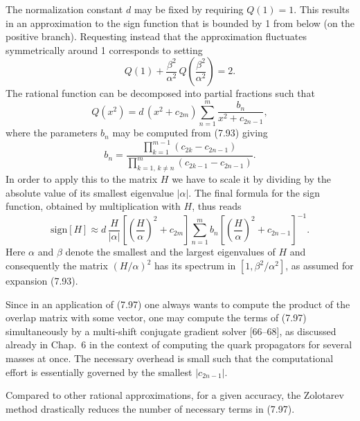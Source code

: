 The normalization constant $d$ may be fixed by requiring $Q(1) = 1$. This
results in an approximation to the sign function that is bounded by 1 from
below (on the positive branch). Requesting instead that the approximation
fluctuates symmetrically around 1 corresponds to setting
\begin{equation}
  Q(1) + \frac{\beta^2}{\alpha^2}\,Q\!\left(\frac{\beta^2}{\alpha^2}\right) = 2 .
\end{equation}
The rational function can be decomposed into partial fractions such that
\begin{equation}
  Q(x^2) = d\,(x^2 + c_{2m})\sum_{n=1}^{m}\frac{b_n}{x^2 + c_{2n-1}},
\end{equation}
where the parameters $b_n$ may be computed from (7.93) giving
\begin{equation}
  b_n = \frac{\prod_{k=1}^{m-1}(c_{2k} - c_{2n-1})}
             {\prod_{k=1,\,k\neq n}^{m}(c_{2k-1} - c_{2n-1})} .
\end{equation}
In order to apply this to the matrix $H$ we have to scale it by dividing by
the absolute value of its smallest eigenvalue $|\alpha|$. The final formula for
the sign function, obtained by multiplication with $H$, thus reads
\begin{equation}
  \mathrm{sign}[H] \approx d\,\frac{H}{|\alpha|}\left[\left(\frac{H}{\alpha}\right)^2 + c_{2m}\right]
  \sum_{n=1}^{m} b_n\left[\left(\frac{H}{\alpha}\right)^2 + c_{2n-1}\right]^{-1} .
\end{equation}
Here $\alpha$ and $\beta$ denote the smallest and the largest eigenvalues of
$H$ and consequently the matrix $(H/\alpha)^2$ has its spectrum in
$[1, \beta^2/\alpha^2]$, as assumed for expansion (7.93).

Since in an application of (7.97) one always wants to compute the product of
the overlap matrix with some vector, one may compute the terms of (7.97)
simultaneously by a multi-shift conjugate gradient solver [66--68], as
discussed already in Chap.~6 in the context of computing the quark propagators
for several masses at once. The necessary overhead is small such that the
computational effort is essentially governed by the smallest $|c_{2n-1}|$.

Compared to other rational approximations, for a given accuracy, the Zolotarev
method drastically reduces the number of necessary terms in (7.97).

